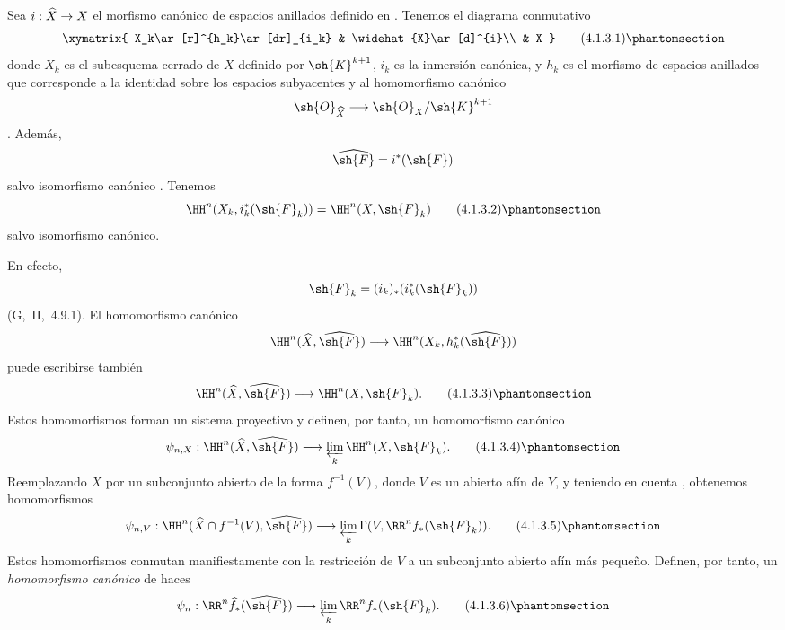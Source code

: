\documentclass[oneside]{amsart}
\makeatletter
\newcommand{\ega@arrow}[2]{\mathchoice{#1}{#2}{#2}{#2}}
\renewcommand{\to}{\ega@arrow{\longrightarrow}{\rightarrow}}
\newcommand{\oldpage}[2][]{{\marginnote{\normalfont\textbf{#1}~|~#2}}\ignorespaces}
\let\EGAOriginalLabel\label
\renewcommand{\label}[1]{\phantomsection\EGAOriginalLabel{#1}}
\makeatother
\begin{document}
\begin{env}[4.1.3]
\label{III.4.1.3}
Sea $i:\widehat{X}\to X$ el morfismo canónico de espacios anillados
definido en .
Tenemos el diagrama conmutativo
\[
  \xymatrix{
    X_k\ar[r]^{h_k}\ar[dr]_{i_k} &
    \widehat{X}\ar[d]^{i}\\
    & X
  }
  \tag{4.1.3.1}
  \label{III.4.1.3.1}
\]
donde $X_k$ es el subesquema cerrado de $X$ definido por
$\sh{K}^{k+1}$, $i_k$ es la inmersión canónica, y $h_k$ es el
morfismo de espacios anillados que corresponde a la identidad sobre
los espacios subyacentes y al homomorfismo canónico
\[
  \sh{O}_{\widehat{X}}
  \longrightarrow
  \sh{O}_X/\sh{K}^{k+1}
\]
.
Además,
\[
  \widehat{\sh{F}}=i^*(\sh{F})
\]
salvo isomorfismo canónico .
Tenemos
\[
  \HH^n(X_k,i_k^*(\sh{F}_k))
  =
  \HH^n(X,\sh{F}_k)
  \tag{4.1.3.2}
  \label{III.4.1.3.2}
\]
salvo isomorfismo canónico.

\oldpage[III]{124}

En efecto,
\[
  \sh{F}_k=(i_k)_*(i_k^*(\sh{F}_k))
\]
(G,~II,~4.9.1).
El homomorfismo canónico
\[
  \HH^n(\widehat{X},\widehat{\sh{F}})
  \longrightarrow
  \HH^n(X_k,h_k^*(\widehat{\sh{F}}))
\]
 puede escribirse también
\[
  \HH^n(\widehat{X},\widehat{\sh{F}})
  \longrightarrow
  \HH^n(X,\sh{F}_k).
  \tag{4.1.3.3}
  \label{III.4.1.3.3}
\]
Estos homomorfismos forman un sistema proyectivo y definen, por tanto,
un homomorfismo canónico
\[
  \psi_{n,X}:
  \HH^n(\widehat{X},\widehat{\sh{F}})
  \longrightarrow
  \varprojlim_k\HH^n(X,\sh{F}_k).
  \tag{4.1.3.4}
  \label{III.4.1.3.4}
\]
Reemplazando $X$ por un subconjunto abierto de la forma $f^{-1}(V)$,
donde $V$ es un abierto afín de $Y$, y teniendo en cuenta
, obtenemos homomorfismos
\[
  \psi_{n,V}:
  \HH^n(\widehat{X}\cap f^{-1}(V),\widehat{\sh{F}})
  \longrightarrow
  \varprojlim_k\Gamma(V,\RR^n f_*(\sh{F}_k)).
  \tag{4.1.3.5}
  \label{III.4.1.3.5}
\]
Estos homomorfismos conmutan manifiestamente con la restricción de $V$
a un subconjunto abierto afín más pequeño.
Definen, por tanto, un \emph{homomorfismo canónico} de haces
\[
  \psi_n:
  \RR^n\widehat{f}_*(\widehat{\sh{F}})
  \longrightarrow
  \varprojlim_k\RR^n f_*(\sh{F}_k).
  \tag{4.1.3.6}
  \label{III.4.1.3.6}
\]
\end{env}
\end{document}
